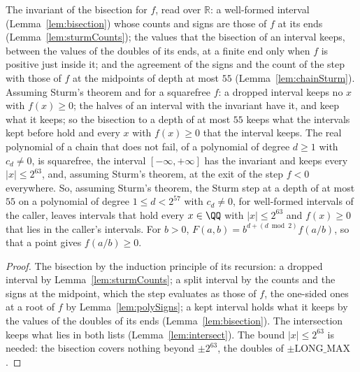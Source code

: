 \begin{lemma}\label{lem:coverage}
  \leanok
  The invariant of the bisection for $f$, read over $\mathbb{R}$: a well-formed interval
  (Lemma~\ref{lem:bisection}) whose counts and signs are those of $f$ at its ends
  (Lemma~\ref{lem:sturmCounts}); the values that the bisection of an interval keeps, between the
  values of the doubles of its ends, at a finite end only when $f$ is positive just inside it; and
  the agreement of the signs and the count of the step with those of $f$ at the midpoints of depth
  at most $55$ (Lemma~\ref{lem:chainSturm}). Assuming Sturm's theorem and for a squarefree $f$: a
  dropped interval keeps no $x$ with $f(x) \ge 0$; the halves of an interval with the invariant have
  it, and keep what it keeps; so the bisection to a depth of at most $55$ keeps what the intervals
  kept before hold and every $x$ with $f(x) \ge 0$ that the interval keeps. The real polynomial of a
  chain that does not fail, of a polynomial of degree $d \ge 1$ with $c_d \ne 0$, is squarefree, the
  interval $[-\infty, +\infty]$ has the invariant and keeps every $|x| \le 2^{63}$, and, assuming
  Sturm's theorem, at the exit of the step $f < 0$ everywhere. So, assuming Sturm's theorem, the
  Sturm step at a depth of at most $55$ on a polynomial of degree $1 \le d < 2^{57}$ with
  $c_d \ne 0$, for well-formed intervals of the caller, leaves intervals that hold every $x \in \QQ$
  with $|x| \le 2^{63}$ and $f(x) \ge 0$ that lies in the caller's intervals. For $b > 0$,
  $F(a, b) = b^{d + (d \bmod 2)} f(a/b)$, so that a point gives $f(a/b) \ge 0$.
\end{lemma}

\begin{proof}
  \leanok
  The bisection by the induction principle of its recursion: a dropped interval by
  Lemma~\ref{lem:sturmCounts}; a split interval by the counts and the signs at the midpoint, which
  the step evaluates as those of $f$, the one-sided ones at a root of $f$ by
  Lemma~\ref{lem:polySigns}; a kept interval holds what it keeps by the values of the doubles of its
  ends (Lemma~\ref{lem:bisection}). The intersection keeps what lies in both lists
  (Lemma~\ref{lem:intersect}). The bound $|x| \le 2^{63}$ is needed: the bisection covers nothing
  beyond $\pm 2^{63}$, the doubles of $\pm\mathrm{LONG\_MAX}$.
\end{proof}

